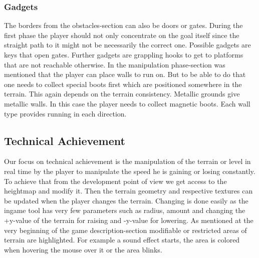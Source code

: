 \documentclass[12pt, letterpaper]{scrartcl}
\begin{document}
	\subsubsection{Gadgets}
	The borders from the obstacles-section can also be doors or gates. During the first phase the player should not only concentrate on the goal itself since the straight path to it might not be necessarily the correct one. Possible gadgets are keys that open gates. Further gadgets are grappling hooks to get to platforms that are not reachable otherwise. In the manipulation phase-section was mentioned that the player can place walls to run on. But to be able to do that one needs to collect special boots first which are positioned somewhere in the terrain. This again depends on the terrain consistency. Metallic grounds give metallic walls. In this case the player needs to collect magnetic boots. Each wall type provides running in each direction.
	
	\subsection{Technical Achievement}
	Our focus on technical achievement is the manipulation of the terrain or level in real time by the player to manipulate the speed he is gaining or losing constantly.
	To achieve that from the development point of view we get access to the heightmap and modify it. Then the terrain geometry and respective textures can be updated when the player changes the terrain. Changing is done easily as the ingame tool has very few parameters such as radius, amount and changing the +y-value of the terrain for raising and -y-value for lowering.
	As mentioned at the very beginning of the game description-section modifiable or restricted areas of terrain are highlighted. For example a sound effect starts, the area is colored when hovering the mouse over it or the area blinks.
	
	\newpage
\end{document}

